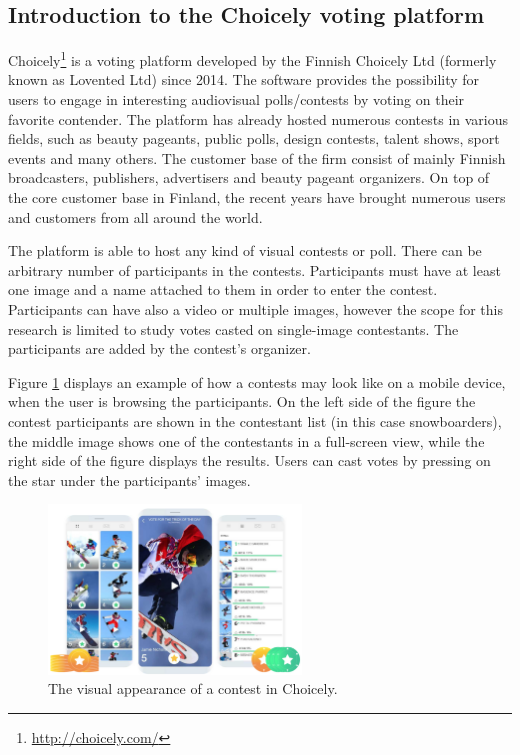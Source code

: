 \subsection{Introduction to the Choicely voting platform}
\label{section::introduction-to-the-choicely-voting-platform}
    Choicely\footnote{\url{http://choicely.com/}} is a voting platform developed by the Finnish Choicely Ltd (formerly known as Lovented Ltd) since 2014. The software provides the possibility for users to engage in interesting audiovisual polls/contests by voting on their favorite contender. The platform has already hosted numerous contests in various fields, such as beauty pageants, public polls, design contests, talent shows, sport events and many others. The customer base of the firm consist of mainly Finnish broadcasters, publishers, advertisers and beauty pageant organizers. On top of the core customer base in Finland, the recent years have brought numerous users and customers from all around the world. 
    
    The platform is able to host any kind of visual contests or poll. There can be arbitrary number of participants in the contests. Participants must have at least one image and a name attached to them in order to enter the contest. Participants can have also a video or multiple images, however the scope for this research is limited to study votes casted on single-image contestants. The participants are added by the contest's organizer. 
    
    Figure \ref{vote_trick_of_the_day} displays an example of how a contests may look like on a mobile device, when the user is browsing the participants. On the left side of the figure the contest participants are shown in the contestant list (in this case snowboarders), the middle image shows one of the contestants in a full-screen view, while the right side of the figure displays the results. Users can cast votes by pressing on the star under the participants' images. 

    \begin{figure}[h] 
        \begin{center}
            \includegraphics[width=0.6\textwidth]{images/vote_trick_of_the_day.png}
            \caption{The visual appearance of a contest in Choicely.}
            \label{vote_trick_of_the_day}
        \end{center}
    \end{figure}

